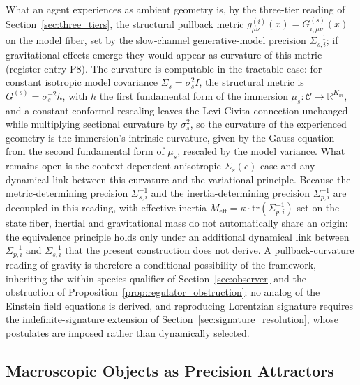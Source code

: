 \documentclass[11pt]{article}
\begin{document}
What an agent experiences as ambient geometry is, by the three-tier reading of Section~\ref{sec:three_tiers}, the structural pullback metric $g_{\mu\nu}^{(i)}(x) = G^{(s)}_{i,\mu\nu}(x)$ on the model fiber, set by the slow-channel generative-model precision $\Sigma_{s,i}^{-1}$; if gravitational effects emerge they would appear as curvature of this metric (register entry P8). The curvature is computable in the tractable case: for constant isotropic model covariance $\Sigma_s = \sigma_s^2 I$, the structural metric is $G^{(s)} = \sigma_s^{-2} h$, with $h$ the first fundamental form of the immersion $\mu_s: \mathcal{C} \to \mathbb{R}^{K_m}$, and a constant conformal rescaling leaves the Levi-Civita connection unchanged while multiplying sectional curvature by $\sigma_s^2$, so the curvature of the experienced geometry is the immersion's intrinsic curvature, given by the Gauss equation from the second fundamental form of $\mu_s$, rescaled by the model variance. What remains open is the context-dependent anisotropic $\Sigma_s(c)$ case and any dynamical link between this curvature and the variational principle. Because the metric-determining precision $\Sigma_{s,i}^{-1}$ and the inertia-determining precision $\Sigma_{p,i}^{-1}$ are decoupled in this reading, with effective inertia $M_{\text{eff}} = \kappa \cdot \mathrm{tr}(\Sigma_{p,i}^{-1})$ set on the state fiber, inertial and gravitational mass do not automatically share an origin: the equivalence principle holds only under an additional dynamical link between $\Sigma_{p,i}^{-1}$ and $\Sigma_{s,i}^{-1}$ that the present construction does not derive. A pullback-curvature reading of gravity is therefore a conditional possibility of the framework, inheriting the within-species qualifier of Section~\ref{sec:observer} and the obstruction of Proposition~\ref{prop:regulator_obstruction}; no analog of the Einstein field equations is derived, and reproducing Lorentzian signature requires the indefinite-signature extension of Section~\ref{sec:signature_resolution}, whose postulates are imposed rather than dynamically selected.

\subsection{Macroscopic Objects as Precision Attractors}
\end{document}
